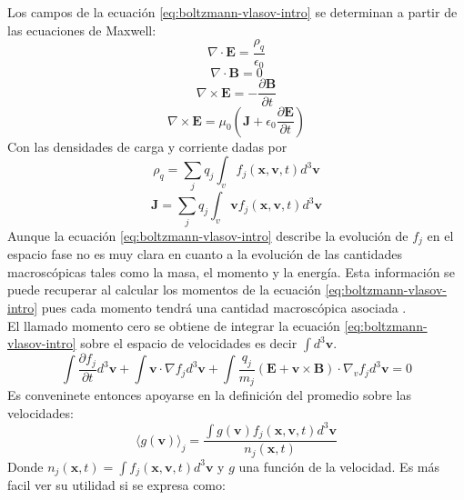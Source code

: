 \documentclass[../tesis_main_file.tex]{subfiles}
\begin{document}
Los campos de la ecuación \ref{eq:boltzmann-vlasov-intro} se determinan a partir de las ecuaciones de Maxwell:
\begin{equation}
\nabla \cdot \textbf{E}=\frac{\rho_q}{\epsilon _0}
\end{equation}
\begin{equation}
\nabla \cdot \textbf{B}=0
\end{equation}
\begin{equation}
\nabla \times \textbf{E}=-\frac{\partial \textbf{B}}{\partial t}
\end{equation}
\begin{equation}
\nabla \times \textbf{E} = \mu _0 \left(\textbf{J}+\epsilon_0\frac{\partial \textbf{E}}{\partial t} \right)
\end{equation}
Con las densidades de carga y corriente dadas por
\begin{equation}
\rho_q = \sum_j q_j \int_v f_j(\textbf{x},\textbf{v},t) d^3 \textbf{v}
\end{equation}
\begin{equation}
\textbf{J}= \sum_j q_j \int_v \textbf{v}f_j(\textbf{x},\textbf{v},t) d^3 \textbf{v}
\end{equation}
Aunque la ecuación \ref{eq:boltzmann-vlasov-intro} describe la evolución de $f_j$ en el espacio fase no es muy clara en cuanto a la evolución de las cantidades macroscópicas tales como la masa, el momento y la energía.
Esta información se puede recuperar al calcular los momentos de la ecuación \ref{eq:boltzmann-vlasov-intro} pues cada momento tendrá una cantidad macroscópica asociada .\\
El llamado momento cero se obtiene de integrar la ecuación \ref{eq:boltzmann-vlasov-intro} sobre el espacio de velocidades es decir $\int d^3 \textbf{v}$.
\begin{equation}
 \int \frac{\partial f_j}{\partial t}d^3 \textbf{v}+ \int \textbf{v}\cdot \nabla f_j d^3 \textbf{v} + \int \frac{q_j}{m_j}\left( \textbf{E} + \textbf{v} \times \textbf{B}\right)\cdot \nabla _v f_j d^3 \textbf{v}=0
\end{equation}
Es conveninete entonces apoyarse en la definición del promedio sobre las velocidades:
\begin{equation}
\langle g(\textbf{v}) \rangle _j = \frac{\int g(\textbf{v})f_j(\textbf{x},\textbf{v},t)d^3\textbf{v}}{n_j(\textbf{x},t)}
\end{equation}
Donde $n_j(\textbf{x},t)=\int f_j(\textbf{x},\textbf{v},t) d^3\textbf{v}$ y $g$ una función de la velocidad. Es más facil ver su utilidad si se expresa como:
\end{document}
